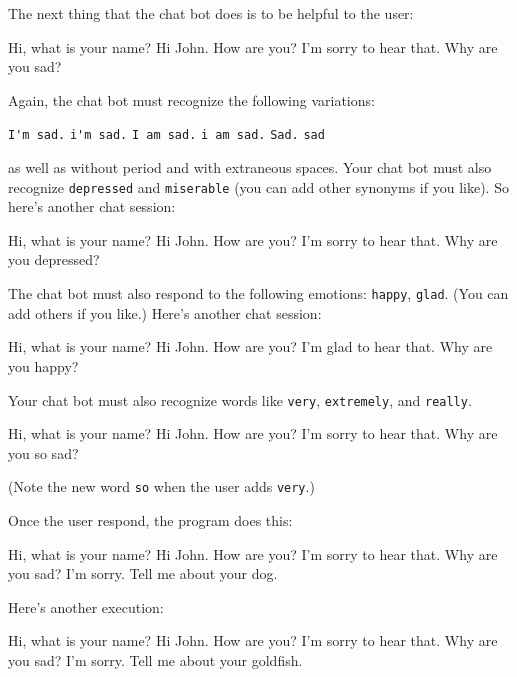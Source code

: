 The next thing that the chat bot does is to be helpful to the user:
\begin{console}[fontsize=\small,frame=single,commandchars=\\\{\}]
Hi, what is your name?
Hi John. How are you?
I'm sorry to hear that. Why are you sad?
\end{console}
Again, the chat bot must recognize the following variations:
\begin{tightlist}
  \li \verb!I'm sad.!
  \li \verb!i'm sad.!
  \li \verb!I am sad.!
  \li \verb!i am sad.!
  \li \verb!Sad.!
  \li \verb!sad!
\end{tightlist}
as well as without period and with extraneous spaces.
Your chat bot must also recognize \verb!depressed! and \verb!miserable! (you can add
other synonyms if you like).
So here's another chat session:
\begin{console}[fontsize=\small,frame=single,commandchars=\\\{\}]
Hi, what is your name?
Hi John. How are you?
I'm sorry to hear that. Why are you depressed?
\end{console}

The chat bot must also respond to the following emotions:
\verb!happy!, \verb!glad!.
(You can add others if you like.)
Here's another chat session:
\begin{console}[fontsize=\small,frame=single,commandchars=\\\{\}]
Hi, what is your name?
Hi John. How are you?
I'm glad to hear that. Why are you happy?
\end{console}

Your chat bot must also recognize words like \verb!very!, \verb!extremely!, and \verb!really!.
\begin{console}[fontsize=\small,frame=single,commandchars=\\\{\}]
Hi, what is your name?
Hi John. How are you?
I'm sorry to hear that. Why are you so sad?
\end{console}
(Note the new word \verb!so! when the user adds \verb!very!.)

Once the user respond, the program does this:
\begin{console}[fontsize=\small,frame=single,commandchars=\\\{\}]
Hi, what is your name?
Hi John. How are you?
I'm sorry to hear that. Why are you  sad?
I'm sorry. Tell me about your dog.
\end{console}
Here's another execution:
\begin{console}[fontsize=\small,frame=single,commandchars=\\\{\}]
Hi, what is your name?
Hi John. How are you?
I'm sorry to hear that. Why are you  sad?
I'm sorry. Tell me about your goldfish.
\end{console}

